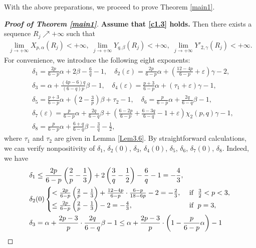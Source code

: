 \documentclass[11pt,reqno]{amsart}
\numberwithin{Thm}{section}
\begin{document}
With the above preparations, we proceed to prove Theorem \ref{main1}.
\begin{proof}[{\bf Proof of Theorem \ref{main1}}]
{\bf Assume that \eqref{c1.3}  holds.} Then there exists a sequence $R_j\nearrow+\infty$ such that
\begin{align}\label{ine3.41}
\lim\limits_{j\rightarrow+\infty}X_{p,\alpha}(R_j)<+\infty,\;\lim\limits_{j\rightarrow+\infty}Y_{q,\beta}(R_j)<+\infty,\;\lim\limits_{j\rightarrow+\infty}Y'_{2,\gamma}(R_j)<+\infty.
\end{align}
For convenience, we introduce the following eight exponents:
\begin{align*}
&\delta_1=\frac{2p}{6-p}\alpha+2\beta-\frac{6}{q}-1,\quad\delta_2(\varepsilon)=\frac{2p}{6-p}\alpha+\left(\frac{12-4p}{6-p}+\varepsilon\right)\gamma-2,\\
&\delta_3=\alpha+\frac{(4p-6)q}{(6-q)p}\beta-1,\quad\delta_4(\varepsilon)=\frac{p+3}{6-p}\alpha+(\tau_1+\varepsilon)\gamma-1,\\
&\delta_5=\frac{p+3}{6-p}\alpha+\left(2-\frac{3}{p}\right)\beta+\tau_2-1,\quad\delta_6=\frac{p}{6-p}\alpha+\frac{2q}{6-q}\beta-1,\\
&\delta_7(\varepsilon)=\frac{p}{6-p}\alpha+\frac{2q}{6-q}\beta+\left(\frac{6-2p}{6-p}+\frac{6-3q}{6-q}-1+\varepsilon\right)\chi_2(p,q)\gamma-1,\\
&\delta_8=\frac{p}{6-p}\alpha+\frac{6+q}{6-q}\beta-\frac{3}{q}-\frac{1}{2},
\end{align*}
where $\tau_1$ and $\tau_2$ are given in Lemma \ref{Lem3.6}. By straightforward calculations, we can verify nonpositivity of
$\delta_1$, $\delta_2(0)$, $\delta_3$, $\delta_4(0)$, $\delta_5$, $\delta_6$, $\delta_7(0)$, $\delta_8$. Indeed, we have
\begin{align}
&\delta_1\leq\frac{2p}{6-p}\left(\frac{2}{p}-\frac{1}{3}\right)+2\left(\frac{3}{q}-\frac{1}{2}\right)-\frac{6}{q}-1=-\frac{4}{3},\notag\\
&\delta_2(0)\begin{cases}
<\frac{2p}{6-p}\left(\frac{2}{p}-\frac{1}{3}\right)+\frac{12-4p}{6-p}\cdot\frac{6-p}{18-6p}-2=-\frac{2}{3}, & \text{ if }\;\frac{3}{2}<p<3, \\
\leq\frac{2p}{6-p}\left(\frac{2}{p}-\frac{1}{3}\right)-2=-\frac{4}{3}, & \text{ if }\;p=3,
\end{cases}\notag\\
&\delta_3=\alpha+\frac{2p-3}{p}\cdot\frac{2q}{6-q}\beta-1\leq\alpha+\frac{2p-3}{p}\cdot\left(1-\frac{p}{6-p}\alpha\right)-1\notag\\

\end{align}
\end{proof}
\end{document}
